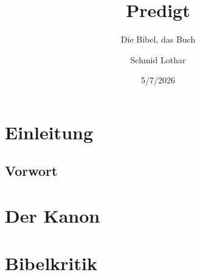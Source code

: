\documentclass[fontsize=16pt]{mybibreport}
\title{Predigt}
\subtitle{Die Bibel, das Buch}
\author{Schmid Lothar}
\date{5/7/2026}
\begin{document}
    \mytitlepage
    \tableofcontents
\newpage
\chapter{Einleitung}
\section{Vorwort}

\chapter{Der Kanon}

\chapter{Bibelkritik}
\end{document}
